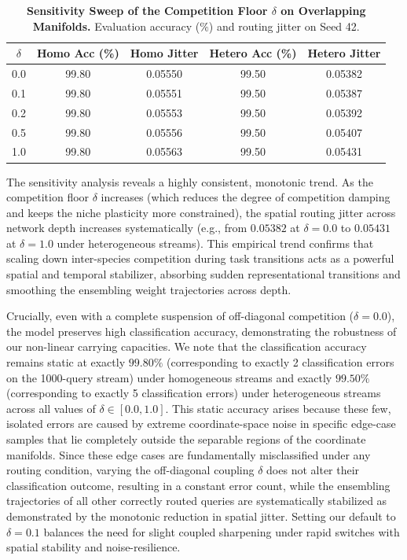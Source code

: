 \begin{table}[htbp]
\caption{\textbf{Sensitivity Sweep of the Competition Floor $\delta$ on Overlapping Manifolds.} Evaluation accuracy ($\%$) and routing jitter on Seed 42.}
\label{tab:delta_sensitivity}
\vskip 0.15in
\begin{center}
\begin{small}
\begin{sc}
\begin{tabular}{ccccc}
\toprule
$\delta$ & Homo Acc (\%) & Homo Jitter & Hetero Acc (\%) & Hetero Jitter \\
\midrule
0.0 & 99.80 & 0.05550 & 99.50 & 0.05382 \\
0.1 & 99.80 & 0.05551 & 99.50 & 0.05387 \\
0.2 & 99.80 & 0.05553 & 99.50 & 0.05392 \\
0.5 & 99.80 & 0.05556 & 99.50 & 0.05407 \\
1.0 & 99.80 & 0.05563 & 99.50 & 0.05431 \\
\bottomrule
\end{tabular}
\end{sc}
\end{small}
\end{center}
\vskip -0.1in
\end{table}

The sensitivity analysis reveals a highly consistent, monotonic trend. As the competition floor $\delta$ increases (which reduces the degree of competition damping and keeps the niche plasticity more constrained), the spatial routing jitter across network depth increases systematically (e.g., from $0.05382$ at $\delta = 0.0$ to $0.05431$ at $\delta = 1.0$ under heterogeneous streams). This empirical trend confirms that scaling down inter-species competition during task transitions acts as a powerful spatial and temporal stabilizer, absorbing sudden representational transitions and smoothing the ensembling weight trajectories across depth. 

Crucially, even with a complete suspension of off-diagonal competition ($\delta = 0.0$), the model preserves high classification accuracy, demonstrating the robustness of our non-linear carrying capacities. We note that the classification accuracy remains static at exactly $99.80\%$ (corresponding to exactly 2 classification errors on the 1000-query stream) under homogeneous streams and exactly $99.50\%$ (corresponding to exactly 5 classification errors) under heterogeneous streams across all values of $\delta \in [0.0, 1.0]$. This static accuracy arises because these few, isolated errors are caused by extreme coordinate-space noise in specific edge-case samples that lie completely outside the separable regions of the coordinate manifolds. Since these edge cases are fundamentally misclassified under any routing condition, varying the off-diagonal coupling $\delta$ does not alter their classification outcome, resulting in a constant error count, while the ensembling trajectories of all other correctly routed queries are systematically stabilized as demonstrated by the monotonic reduction in spatial jitter. Setting our default to $\delta = 0.1$ balances the need for slight coupled sharpening under rapid switches with spatial stability and noise-resilience.

